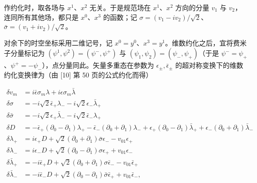 作约化时，取各场与 $x^1$、$x^2$ 无关。于是规范场在 $x^1$、$x^2$ 方向的分量 $v_1$ 与 $v_2$，连同所有其他场，都只是 $x^0$、$x^3$ 的函数；记 $\sigma=(v_1-iv_2)/\sqrt2$、$\bar\sigma=(v_1+iv_2)/\sqrt2$。

\label{op:8}

对余下的时空坐标采用二维记号，记 $x^0=y^0$、$x^3=y^1$。维数约化之后，宜将费米子分量标记为 $(\psi^1,\psi^2)=(\psi^-,\psi^+)$ 与 $(\psi_1,\psi_2)=(\psi_-,\psi_+)$（于是 $\psi^-=\psi_+$、$\psi^+=-\psi_-$），点分量同此。矢量多重态在参数为 $\epsilon_\pm,\bar\epsilon_\pm$ 的超对称变换下的维数约化变换律为（由 [10] 第 50 页的公式约化而得）

\begin{equation}
\begin{aligned}
\delta v_m &= i\bar\epsilon\sigma_m\lambda+i\epsilon\sigma_m\bar\lambda\\
\delta\sigma &= -i\sqrt2\bar\epsilon_+\lambda_--i\sqrt2\epsilon_-\bar\lambda_+\\
\delta\bar\sigma &= -i\sqrt2\epsilon_+\bar\lambda_--i\sqrt2\bar\epsilon_-\lambda_+\\
\delta D &= -\bar\epsilon_+(\partial_0-\partial_1)\lambda_+-\bar\epsilon_-(\partial_0+\partial_1)\lambda_-+\epsilon_+(\partial_0-\partial_1)\bar\lambda_++\epsilon_-(\partial_0+\partial_1)\bar\lambda_-\\
\delta\lambda_+ &= i\epsilon_+D+\sqrt2(\partial_0+\partial_1)\bar\sigma\epsilon_- -v_{01}\epsilon_+\\
\delta\lambda_- &= i\epsilon_-D+\sqrt2(\partial_0-\partial_1)\sigma\epsilon_+ +v_{01}\epsilon_-\\
\delta\bar\lambda_+ &= -i\bar\epsilon_+D+\sqrt2(\partial_0+\partial_1)\sigma\bar\epsilon_- -v_{01}\bar\epsilon_+\\
\delta\bar\lambda_- &= -i\bar\epsilon_-D+\sqrt2(\partial_0-\partial_1)\bar\sigma\bar\epsilon_+ +v_{01}\bar\epsilon_-,
\end{aligned}
\tag{2.12}
\end{equation}


